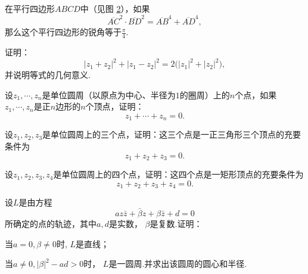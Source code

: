 \begin{xiti}
\begin{figure}[!ht]
 \begin{minipage}[b]{0.48\textwidth}
 \centering
   \caption{}\label{fig1.6}
 \end{minipage}
 \end{figure}
 \begin{figure}[!ht]
  \centering
  \caption{}\label{fig1.7}
 \end{figure}
 \item 在平行四边形$ABCD$中（见图 \ref{fig1.7}），如果
   \[\overline{AC}^2\cdot\overline{BD}^2=\overline{AB}^4+\overline{AD}^4,\]
 那么这个平行四边形的锐角等于$\frac\pi4$.
 \item 证明：
   \[|z_1+z_2|^2+|z_1-z_2|^2=2\big(|z_1|^2+|z_2|^2\big),\]
 并说明等式的几何意义.
 \item 设$z_1,\cdots,z_n$是单位圆周（以原点为中心、半径为$1$的圈周）上的$n$个点，如果$z_1,\cdots,z_n$是正$n$边形的$n$个顶点，证明：
     \[z_1+\cdots+z_n=0.\]
 \item 设$z_1,z_2,z_3$是单位圆周上的三个点，证明：这三个点是一正三角形三个顶点的充要条件为
     \[z_1+z_2+z_3=0.\]
 \item 设$z_1,z_2,z_3,z_4$是单位圆周上的四个点，证明：这四个点是一矩形顶点的充要条件为
     \[z_1+z_2+z_3+z_4=0.\]
 \item 设$L$是由方程\hypertarget{xiti1.2.14}{}
     \[az\bar z+\bar\beta z+\beta\bar z+d=0\]
 所确定的点的轨迹，其中$a,d$是实数， $\beta$是复数.证明：
   \begin{enuma}
     \item 当$a=0,\beta\ne0$时, $L$是直线；
     \item 当$a\ne0,|\beta|^2-ad>0$时， $L$是一圆周.并求出该圆周的圆心和半径.

\end{enuma}
\end{xiti}
